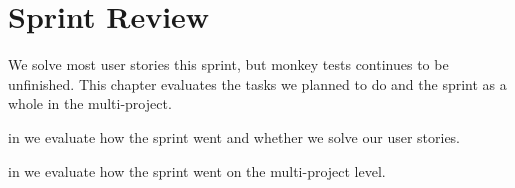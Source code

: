 \chapter{Sprint Review}\label{chap:sprint2_end}
We solve most user stories this sprint, but monkey tests continues to be unfinished. This chapter evaluates the tasks we planned to do and the sprint as a whole in the multi-project.

\begin{chapterorganization}
  \item in  we evaluate how the sprint went and whether we solve our user stories.
  \item in  we evaluate how the sprint went on the multi-project level.
\end{chapterorganization}

